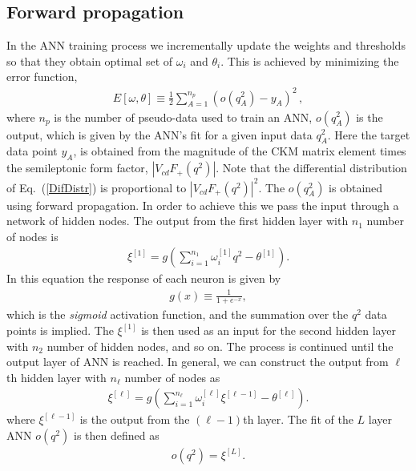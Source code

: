 \subsection{Forward propagation}
In the ANN training process we incrementally update the weights and thresholds so that they obtain optimal set of $\omega_i$ and $\theta_i$. This is achieved by minimizing the error function,
%
\begin{eqnarray}\label{error_fun}
E[{\omega,\theta}]\equiv\frac{1}{2}\sum_{A=1}^{n_p}
(o(q^2_{A})-y_{A})^2\,,
\end{eqnarray}
%
where $n_p$ is the number of pseudo-data used to train an ANN, $o( q^2_{A})$ is the output, which is given by the ANN's fit for a given input data $q^2_{A}$.
Here the target data point $y_A$, is obtained from the magnitude of the CKM matrix element times the semileptonic form factor, $\left|V_{cd} F_+(q^2)\right|$.
Note that the differential distribution of Eq.~(\ref{DifDistr}) is proportional to $\left|V_{cd} F_+(q^2)\right|^2$.
The $o(q^2_{A})$ is obtained using forward propagation. In order to achieve this we pass the input through a network of hidden nodes. The output from the first hidden layer with 
$n_1$ number of nodes is \cite{Grant:2019yar}
%
\begin{eqnarray}\label{first_layer_output}
\xi^{[1]}=g\left(\sum_{i=1}^{n_1}\omega_{i}^{[1]}q^2-\theta^{[1]}\right).
\end{eqnarray}
%
In this equation the response of each neuron is given by \cite{Grant:2019yar}
%
\begin{eqnarray}\label{sigmoid}
g(x)\equiv\frac{1}{1+e^{-x}},
\end{eqnarray}
% 
which is the \textit{sigmoid} activation function, and the summation over the $q^2$ data points is implied.
The $\xi^{[1]}$ is then used as an input for the second hidden layer with $n_2$ number of hidden nodes, and so on. The process is continued until the output layer of ANN is reached. In general, 
we can construct the output from $\ell$th hidden layer with $n_\ell$ number of nodes as \cite{Grant:2019yar}
%
\begin{eqnarray}\label{general_output}
\xi^{[\ell]}=g\left(\sum_{i=1}^{n_{\ell}}\omega_{i}^{[\ell]}\xi^{[\ell-1]}- \theta^{[\ell]} \right)  .
\end{eqnarray}
%
where $\xi^{[\ell-1]}$ is the output from the $(\ell-1)$th layer. The fit of the $L$ layer ANN $o(q^2)$ is then defined as   
%
\begin{eqnarray}
o(q^2)=\xi^{[L]}.
\end{eqnarray}

